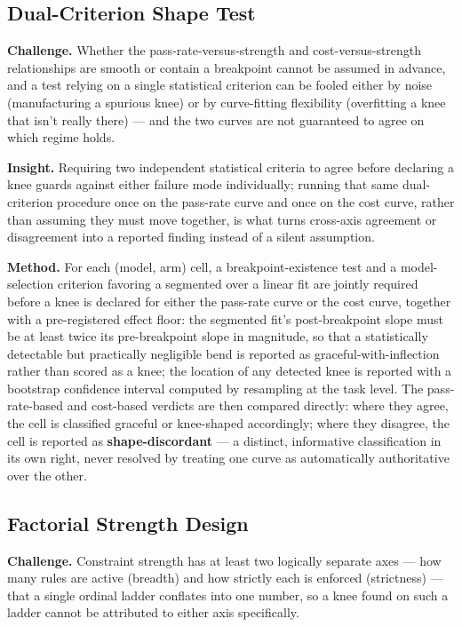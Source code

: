 \documentclass[11pt]{article}
\begin{document}
\subsection{Dual-Criterion Shape Test}
\textbf{Challenge.} Whether the pass-rate-versus-strength and cost-versus-strength relationships are smooth or contain a breakpoint cannot be assumed in advance, and a test relying on a single statistical criterion can be fooled either by noise (manufacturing a spurious knee) or by curve-fitting flexibility (overfitting a knee that isn't really there) --- and the two curves are not guaranteed to agree on which regime holds.

\textbf{Insight.} Requiring two independent statistical criteria to agree before declaring a knee guards against either failure mode individually; running that same dual-criterion procedure once on the pass-rate curve and once on the cost curve, rather than assuming they must move together, is what turns cross-axis agreement or disagreement into a reported finding instead of a silent assumption.

\textbf{Method.} For each (model, arm) cell, a breakpoint-existence test and a model-selection criterion favoring a segmented over a linear fit are jointly required before a knee is declared for either the pass-rate curve or the cost curve, together with a pre-registered effect floor: the segmented fit's post-breakpoint slope must be at least twice its pre-breakpoint slope in magnitude, so that a statistically detectable but practically negligible bend is reported as graceful-with-inflection rather than scored as a knee; the location of any detected knee is reported with a bootstrap confidence interval computed by resampling at the task level. The pass-rate-based and cost-based verdicts are then compared directly: where they agree, the cell is classified graceful or knee-shaped accordingly; where they disagree, the cell is reported as \textbf{shape-discordant} --- a distinct, informative classification in its own right, never resolved by treating one curve as automatically authoritative over the other.

\subsection{Factorial Strength Design}
\textbf{Challenge.} Constraint strength has at least two logically separate axes --- how many rules are active (breadth) and how strictly each is enforced (strictness) --- that a single ordinal ladder conflates into one number, so a knee found on such a ladder cannot be attributed to either axis specifically.
\end{document}
